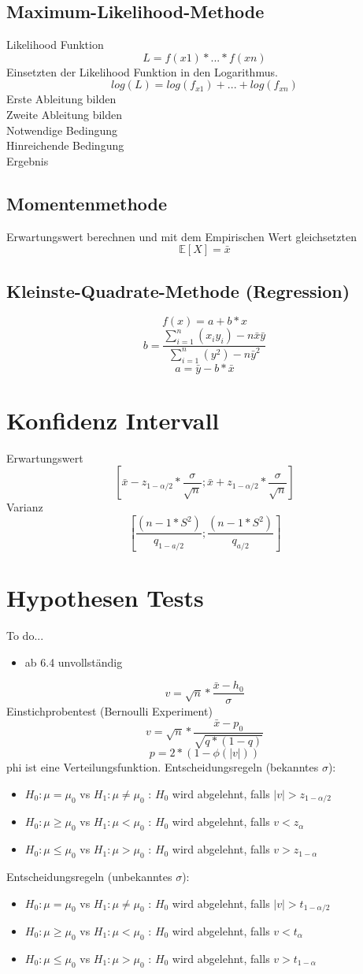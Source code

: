 \documentclass{article}
\begin{document}
	\subsection{Maximum-Likelihood-Methode}
	Likelihood Funktion
	\[L = f(x1) * ... * f(xn)\]
	Einsetzten der Likelihood Funktion in den Logarithmus.
	\[ log(L) = log(f_{x1})+...+log(f_{xn}) \]
	Erste Ableitung bilden
	\[\]
	Zweite Ableitung bilden
	\[\]
	Notwendige Bedingung
	\[\]
	Hinreichende Bedingung
	\[\]
	Ergebnis
	\[\]
	\subsection{Momentenmethode}
	Erwartungswert berechnen und mit dem Empirischen Wert gleichsetzten
	\[\mathbb{E}[X]=\bar{x}\]
	
	\subsection{Kleinste-Quadrate-Methode (Regression)}
	\[f(x)=a+b*x\]
	\[b = \frac{\sum_{i=1}^{n}(x_i y_i)-n\bar{x}\bar{y}}{\sum_{i=1}^{n}(y^2)-n\bar{y}^2}\]
	\[a=\bar{y}-b*\bar{x}\]
	\section{Konfidenz Intervall}
	Erwartungswert
	\[[\bar{x}-z_{1-\alpha/2}*\frac{\sigma}{\sqrt{n}};\bar{x}+z_{1-\alpha/2}*\frac{\sigma}{\sqrt{n}}]\]
	Varianz
	\[[\frac{(n-1*S^2)}{q_{1-a/2}};\frac{(n-1*S^2)}{q_{a/2}}]\]
	\section{Hypothesen Tests}
	To do...
	\begin{itemize}
		\item ab 6.4 unvollständig 
	\end{itemize}
	\[v=\sqrt{n}*\frac{\bar{x}-h_0}{\sigma}\]
	Einstichprobentest (Bernoulli Experiment)
	\[v=\sqrt{n}*\frac{\bar{x}-p_0}{\sqrt{q*(1-q)}}\]
	\linebreak 
	\[p=2*(1-\phi(|v|))\]
	phi ist eine Verteilungsfunktion.
	\linebreak
	Entscheidungsregeln (bekanntes $\sigma$):
	\begin{itemize}
		\item $H_0 : \mu = \mu_0$ vs $H_1 : \mu \ne \mu_0$ : $H_0$ wird abgelehnt, falls $|v| > z_{1-\alpha/2}$
		\item $H_0 : \mu \ge \mu_0$ vs $H_1 : \mu < \mu_0$ : $H_0$ wird abgelehnt, falls $v < z_{\alpha}$
		\item $H_0 : \mu \le \mu_0$ vs $H_1 : \mu > \mu_0$ : $H_0$ wird abgelehnt, falls $v > z_{1-\alpha}$
	\end{itemize}
	Entscheidungsregeln (unbekanntes $\sigma$):
	\begin{itemize}
		\item $H_0 : \mu = \mu_0$ vs $H_1 : \mu \ne \mu_0$ : $H_0$ wird abgelehnt, falls $|v| > t_{1-\alpha/2}$
		\item $H_0 : \mu \ge \mu_0$ vs $H_1 : \mu < \mu_0$ : $H_0$ wird abgelehnt, falls $v < t_{\alpha}$
		\item $H_0 : \mu \le \mu_0$ vs $H_1 : \mu > \mu_0$ : $H_0$ wird abgelehnt, falls $v > t_{1-\alpha}$
	\end{itemize}
\end{document}
